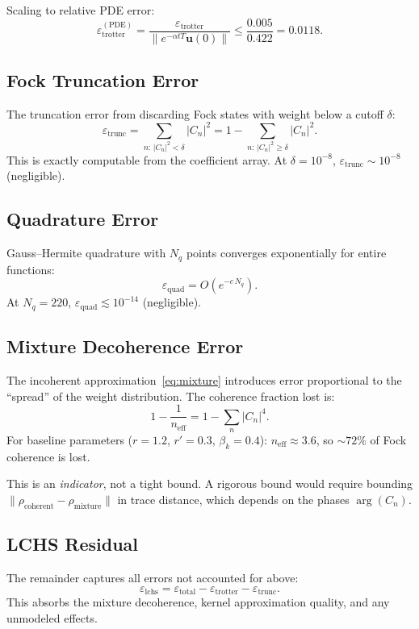 \documentclass[11pt]{article}
\newcommand{\norm}[1]{\|{#1}\|}
\newcommand{\eps}{\varepsilon}
\begin{document}
Scaling to relative PDE error:
\begin{equation}
\eps_{\mathrm{trotter}}^{(\mathrm{PDE})}
= \frac{\eps_{\mathrm{trotter}}}{\norm{e^{-\alpha t T}\bm{u}(0)}}
\leq \frac{0.005}{0.422} = 0.0118.
\end{equation}

\subsection{Fock Truncation Error}
The truncation error from discarding Fock states with weight below a cutoff $\delta$:
\begin{equation}
\eps_{\mathrm{trunc}} = \sum_{n:\,|C_n|^2 < \delta} |C_n|^2 = 1 - \sum_{n:\,|C_n|^2\geq\delta} |C_n|^2.
\end{equation}
This is exactly computable from the coefficient array.
At $\delta=10^{-8}$, $\eps_{\mathrm{trunc}} \sim 10^{-8}$ (negligible).

\subsection{Quadrature Error}
Gauss--Hermite quadrature with $N_q$ points converges exponentially for entire
functions:
\begin{equation}
\eps_{\mathrm{quad}} = O\!\left(e^{-c\,N_q}\right).
\end{equation}
At $N_q = 220$, $\eps_{\mathrm{quad}} \lesssim 10^{-14}$ (negligible).

\subsection{Mixture Decoherence Error}
The incoherent approximation~\eqref{eq:mixture} introduces error proportional to
the ``spread'' of the weight distribution.
The coherence fraction lost is:
\begin{equation}
1 - \frac{1}{n_{\mathrm{eff}}} = 1 - \sum_n |C_n|^4.
\end{equation}
For baseline parameters ($r=1.2$, $r'=0.3$, $\beta_k=0.4$):
$n_{\mathrm{eff}} \approx 3.6$, so $\sim 72\%$ of Fock coherence is lost.

This is an \emph{indicator}, not a tight bound.  A rigorous bound would require
bounding $\norm{\rho_{\mathrm{coherent}} - \rho_{\mathrm{mixture}}}$ in trace
distance, which depends on the phases $\arg(C_n)$.

\subsection{LCHS Residual}
The remainder captures all errors not accounted for above:
\begin{equation}
\eps_{\mathrm{lchs}} = \eps_{\mathrm{total}} - \eps_{\mathrm{trotter}} - \eps_{\mathrm{trunc}}.
\end{equation}
This absorbs the mixture decoherence, kernel approximation quality, and any
unmodeled effects.
\end{document}
